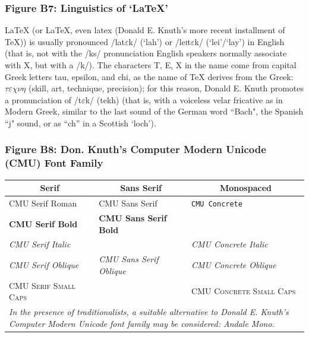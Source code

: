 \documentclass[11pt, english]{article}
\begin{document}
		\newpage

		\subsubsection*{Figure B7: Linguistics of `{\LaTeX}'}

		{\LaTeX} (or LaTeX, even latex (Donald E. Knuth's more recent installment of {\TeX})) is usually pronounced /la\textlengthmark t$\varepsilon$k/ (`lah') or /le\textsc{i}t$\varepsilon$k/ (`lei'/`lay') in English (that is, not with the /ks/ pronunciation English speakers normally associate with X, but with a /k/). The characters T, E, X in the name come from capital Greek letters tau, epsilon, and chi, as the name of {\TeX} derives from the Greek: $\tau\varepsilon\chi\nu\eta$ (skill, art, technique, precision); for this reason, Donald E. Knuth promotes a pronunciation of /t$\varepsilon$k/ (tekh) (that is, with a voiceless velar fricative as in Modern Greek, similar to the last sound of the German word ``Bach", the Spanish ``j" sound, or as ``ch'' in a Scottish `loch'). 

		\subsubsection*{Figure B8: Don. Knuth's Computer Modern Unicode (CMU) Font Family}

		\begin{table}[h]
			\scriptsize
			\renewcommand{\arraystretch}{1.25}
		\begin{center}
			\begin{tabular}{p{4cm}p{4cm}p{4cm}}
			\hline
			\multicolumn{1}{c}{\textbf{Serif}} & \multicolumn{1}{c}{\textbf{Sans Serif}} & \multicolumn{1}{c}{\textbf{Monospaced}}\\
			\hline
			CMU Serif Roman & \textsf{CMU Sans Serif} & \texttt{CMU Concrete}\\
			\textbf{CMU Serif Bold} & \sffamily \textbf{CMU Sans Serif Bold} & \\ 
				\textit{CMU Serif Italic} & & \ttfamily \textit{CMU Concrete Italic}\\
			\textsl{CMU Serif Oblique} & \sffamily \textsl{CMU Sans Serif Oblique} & \ttfamily \textsl{CMU Concrete Oblique}\\
				\textsc{CMU Serif Small Caps} & & \ttfamily \textsc{CMU Concrete Small Caps}\\
			\hline
				\multicolumn{3}{p{13cm}}{\textit{In the presence of traditionalists, a suitable alternative to Donald E. Knuth's Computer Modern Unicode font family may be considered: Andale Mono.}}\\
			\hline
		\end{tabular}
		\end{center}
		\end{table}
\end{document}
